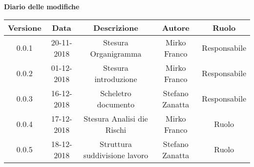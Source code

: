 	\begin{center}
		\textbf{Diario delle modifiche}
	\end{center}
	\begin{center}
		\begin{tabular}{|c|c|c|c|c|}
			\hline
			\textbf{Versione} & \textbf{Data} & \textbf{Descrizione} & \textbf{Autore} & \textbf{Ruolo} \\
			\hline
			0.0.1 & 20-11-2018 & Stesura Organigramma & Mirko Franco & Responsabile\\
			\hline
			0.0.2 & 01-12-2018 & Stesura introduzione & Mirko Franco & Responsabile\\
			\hline
			0.0.3 & 16-12-2018 & Scheletro documento &Stefano Zanatta & Responsabile\\
			\hline
			0.0.4 & 17-12-2018 & Stesura Analisi die Rischi & Mirko Franco & Ruolo\\
			\hline
			0.0.5 & 18-12-2018 & Struttura suddivisione lavoro & Stefano Zanatta &Ruolo\\
			\hline
			
		\end{tabular}
	\end{center}
\newpage